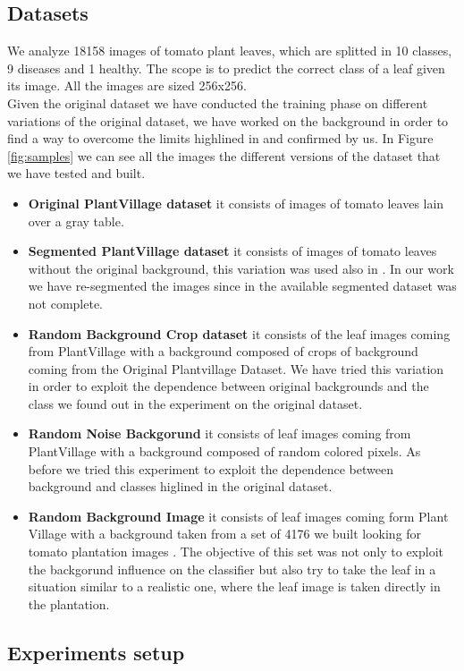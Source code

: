 \subsection{Datasets}
We analyze 18158 images of tomato plant leaves, which are splitted in 10 classes, 9 diseases and 1 healthy. The scope is to predict the correct class of a leaf given its image. All the images are sized 256x256. 
\\\indent Given the original dataset we have conducted the training phase on different variations of the original dataset, we have worked on the background in order to find a way to overcome the limits highlined in \cite{} and confirmed by us.
In Figure \ref{fig:samples} we can see all the images the different versions of the dataset that we have tested and built.
\begin{itemize}
\item{\textbf{Original PlantVillage dataset} it consists of images of tomato leaves lain over a gray table.}
\item{\textbf{Segmented PlantVillage dataset} it consists of images of tomato leaves without the original background, this variation was used also in \cite{}. In our work we have re-segmented the images since in the available segmented dataset was not complete.}
\item{\textbf{Random Background Crop dataset} it consists of the leaf images coming from PlantVillage with a background composed of crops of background coming from the Original Plantvillage Dataset. We have tried this variation in order to exploit the dependence between original backgrounds and the class we found out in the experiment on the original dataset.}
\item{\textbf{Random Noise Backgorund} it consists of leaf images coming from PlantVillage with a background composed of random colored pixels. As before we tried this experiment to exploit the dependence between background and classes higlined in the original dataset.}
\item{\textbf{Random Background Image} it consists of leaf images coming form Plant Village with a background taken from a set of 4176 we built looking for tomato plantation images . The objective of this set was not only to exploit the backgorund influence on the classifier but also try to take the leaf in a situation similar to a realistic one, where the leaf image is taken directly in the plantation.}
\end{itemize}

\subsection{Experiments setup}
